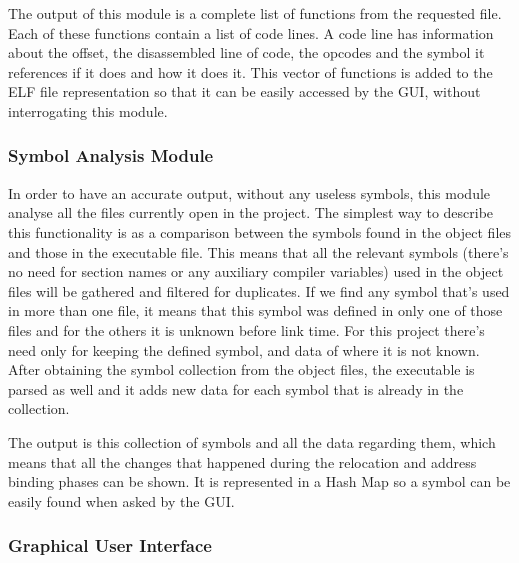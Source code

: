 The output of this module is a complete list of functions from the requested file. Each of these functions contain a list of code lines. A code line has information about the offset, the disassembled line of code, the opcodes and the symbol it references if it does and how it does it. This vector of functions is added to the ELF file representation so that it can be easily accessed by the GUI, without interrogating this module.

\subsubsection{Symbol Analysis Module}
\label{sub-sec:sym-mod}

In order to have an accurate output, without any useless symbols, this module analyse all the files currently open in the project. The simplest way to describe this functionality is as a comparison between the symbols found in the object files and those in the executable file. This means that all the relevant symbols (there's no need for section names or any auxiliary compiler variables) used in the object files will be gathered and filtered for duplicates. If we find any symbol that's used in more than one file, it means that this symbol was defined in only one of those files and for the others it is unknown before link time. For this project there's need only for keeping the defined symbol, and data of where it is not known. After obtaining the symbol collection from the object files, the executable is parsed as well and it adds new data for each symbol that is already in the collection.

The output is this collection of symbols and all the data regarding them, which means that all the changes that happened during the relocation and address binding phases can be shown. It is represented in a Hash Map so a symbol can be easily found when asked by the GUI.

\subsubsection{Graphical User Interface}
\label{sub-sec:gui-mod}

